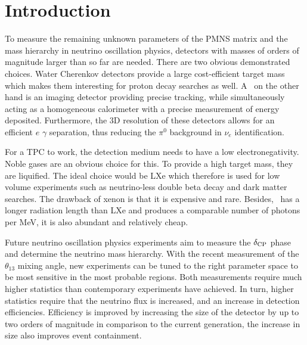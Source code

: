 \renewcommand{\Chapter}{Introduction}
\chapter*{\Chapter\label{chap:introduction}}
\chaptermark{\Chapter}
\addcontentsline{toc}{chapter}{\Chapter}
To measure the remaining unknown parameters of the PMNS matrix and the mass hierarchy in neutrino oscillation physics, detectors with masses of orders of magnitude larger than so far are needed.
There are two obvious demonstrated choices.
Water Cherenkov detectors provide a large cost-efficient target mass which makes them interesting for proton decay searches as well.
A \lartpc\ on the other hand is an imaging detector providing precise tracking, while simultaneously acting as a homogeneous calorimeter with a precise measurement of energy deposited.
Furthermore, the 3D resolution of these detectors allows for an efficient $e$ $\gamma$ separation, thus reducing the $\pi^0$ background in $\nu_e$ identification.

For a TPC to work, the detection medium needs to have a low electronegativity.
Noble gases are an obvious choice for this.
To provide a high target mass, they are liquified.
The ideal choice would be LXe which therefore is used for low volume experiments such as neutrino-less double beta decay and dark matter searches.
The drawback of xenon is that it is expensive and rare.
Besides, \lar\ has a longer radiation length than LXe and produces a comparable number of photons per \si{\mega\electronvolt}, it is also abundant and relatively cheap.

Future neutrino oscillation physics experiments aim to measure the $\delta_{\mathrm{CP}}$ phase and determine the neutrino mass hierarchy.
With the recent measurement of the $\theta_{13}$ mixing angle, new experiments can be tuned to the right parameter space to be most sensitive in the most probable regions.
Both measurements require much higher statistics than contemporary experiments have achieved.
In turn, higher statistics require that the neutrino flux is increased, and an increase in detection efficiencies.
Efficiency is improved by increasing the size of the detector by up to two orders of magnitude in comparison to the current generation, the increase in size also improves event containment.

